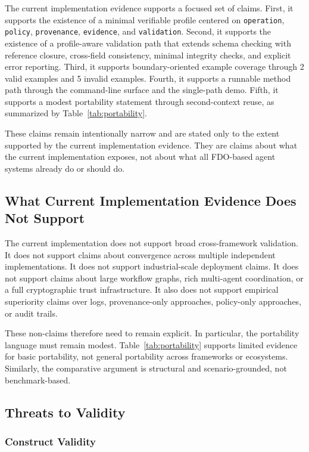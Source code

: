 The current implementation evidence supports a focused set of claims. First, it supports the existence of a minimal verifiable profile centered on \texttt{operation}, \texttt{policy}, \texttt{provenance}, \texttt{evidence}, and \texttt{validation}. Second, it supports the existence of a profile-aware validation path that extends schema checking with reference closure, cross-field consistency, minimal integrity checks, and explicit error reporting. Third, it supports boundary-oriented example coverage through 2 valid examples and 5 invalid examples. Fourth, it supports a runnable method path through the command-line surface and the single-path demo. Fifth, it supports a modest portability statement through second-context reuse, as summarized by Table~\ref{tab:portability}.

These claims remain intentionally narrow and are stated only to the extent supported by the current implementation evidence. They are claims about what the current implementation exposes, not about what all FDO-based agent systems already do or should do.

\subsection{What Current Implementation Evidence Does Not Support}

The current implementation does not support broad cross-framework validation. It does not support claims about convergence across multiple independent implementations. It does not support industrial-scale deployment claims. It does not support claims about large workflow graphs, rich multi-agent coordination, or a full cryptographic trust infrastructure. It also does not support empirical superiority claims over logs, provenance-only approaches, policy-only approaches, or audit trails.

These non-claims therefore need to remain explicit. In particular, the portability language must remain modest. Table~\ref{tab:portability} supports limited evidence for basic portability, not general portability across frameworks or ecosystems. Similarly, the comparative argument is structural and scenario-grounded, not benchmark-based.

\subsection{Threats to Validity}

\subsubsection{Construct Validity}


